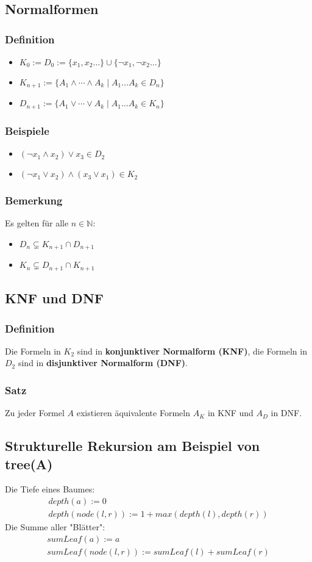 \subsection{Normalformen}
\subsubsection{Definition}
\begin{itemize}
\item $K_0 := D_0 := \{x_1, x_2 \ldots \} \cup \{\neg x_1, \neg x_2 \ldots \}$
\item $K_{n+1} := \{A_1 \wedge \cdots \wedge A_k \mid A_1 \ldots A_k \in D_n\}$
\item $D_{n+1} := \{A_1 \vee \cdots \vee A_k \mid A_1 \ldots A_k \in K_n\}$
\end{itemize}

\subsubsection{Beispiele}
\begin{itemize}
\item $(\neg x_1 \wedge x_2) \vee x_3 \in D_2$
\item $(\neg x_1 \vee x_2) \wedge (x_3 \vee x_1) \in K_2$
\end{itemize}

\subsubsection{Bemerkung}
Es gelten für alle $n \in \mathbb{N}$:
\begin{itemize}
\item $D_n \subsetneq K_{n+1} \cap D_{n+1}$
\item $K_n \subsetneq D_{n+1} \cap K_{n+1}$
\end{itemize}
\subsection{KNF und DNF}
\subsubsection{Definition}
Die Formeln in $K_2$ sind in \textbf{konjunktiver Normalform (KNF)}, die
Formeln in $D_2$ sind in \textbf{disjunktiver Normalform (DNF)}.
\subsubsection{Satz}
Zu jeder Formel $A$ existieren äquivalente Formeln $A_K$ in KNF und
$A_D$ in DNF.
\subsection{Strukturelle Rekursion am Beispiel von tree(A)}
Die Tiefe eines Baumes:
\begin{align*}
	depth(a) := 0\\
	depth(node(l,r)) := 1 + max(depth(l), depth(r))
\end{align*}
Die Summe aller "Blätter":
\begin{align*}
	sumLeaf(a) := a\\
	sumLeaf(node(l,r)) := sumLeaf(l) + sumLeaf(r)
\end{align*}

